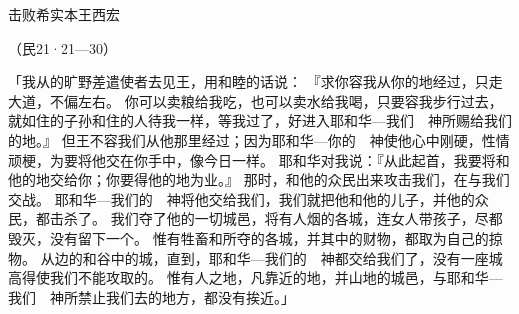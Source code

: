 {\par }{\SH 击败希实本王西宏
\par }{\R （民21·21—30）
\par }{\PP {}「我从{}的旷野差遣使者去见{}王{}，用和睦的话说：
『求你容我从你的地经过，只走大道，不偏左右。
你可以卖粮给我吃，也可以卖水给我喝，只要容我步行过去，
就如住{}的{}子孙和住{}的{}人待我一样，等我过了{}，好进入耶和华—我们　神所赐给我们的地。』
但{}王{}不容我们从他那里经过；因为耶和华—你的　神使他心中刚硬，性情顽梗，为要将他交在你手中，像今日一样。
耶和华对我说：『从此起首，我要将{}和他的地交给你；你要得他的地为业。』
那时，{}和他的众民出来攻击我们，在{}与我们交战。
耶和华—我们的　神将他交给我们，我们就把他和他的儿子，并他的众民，都击杀了。
我们夺了他的一切城邑，将有人烟的各城，连女人带孩子，尽都毁灭，没有留下一个。
惟有牲畜和所夺的各城，并其中的财物，都取为自己的掠物。
从{}边的{}和谷中的城，直到{}，耶和华—我们的　神都交给我们了，没有一座城高得使我们不能攻取的。
惟有{}人之地，凡靠近{}的地，并山地的城邑，与耶和华—我们　神所禁止我们去的地方，都没有挨近。」

}
